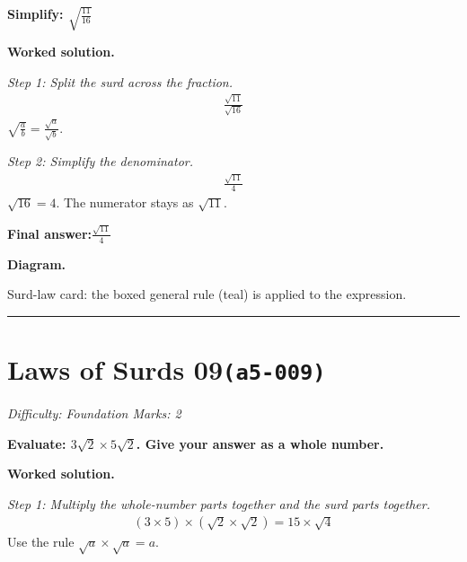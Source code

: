 \documentclass[11pt]{article}
\newcommand{\question}[1]{\par\medskip\noindent\textbf{#1}\par}
\begin{document}
\question{Simplify: \( \sqrt{\frac{11}{16}} \)}

\textbf{Worked solution.}

\textit{Step 1: Split the surd across the fraction.}
\[\begin{gathered}
\frac{\sqrt{11}}{\sqrt{16}}
\end{gathered}\]
\( \sqrt{\frac{a}{b}} = \frac{\sqrt{a}}{\sqrt{b}} \).

\textit{Step 2: Simplify the denominator.}
\[\begin{gathered}
\frac{\sqrt{11}}{4}
\end{gathered}\]
\( \sqrt{16} = 4 \). The numerator stays as \( \sqrt{11} \).

\begin{answerbox}
\textbf{Final answer:}\quad \(\displaystyle \frac{\sqrt{11}}{4}\)
\end{answerbox}
\textbf{Diagram.}

\begin{center}
\end{center}
\small Surd-law card: the boxed general rule (teal) is applied to the expression.\normalsize

\medskip\hrule

\section*{Laws of Surds 09\quad\small\texttt{(a5-009)}}
\textit{Difficulty: Foundation \quad\textbar\quad Marks: 2}

\question{Evaluate: \( 3\sqrt{2} \times 5\sqrt{2} \). Give your answer as a whole number.}

\textbf{Worked solution.}

\textit{Step 1: Multiply the whole-number parts together and the surd parts together.}
\[\begin{gathered}
(3 \times 5) \times (\sqrt{2} \times \sqrt{2}) = 15 \times \sqrt{4}
\end{gathered}\]
Use the rule \( \sqrt{a} \times \sqrt{a} = a \).
\end{document}
